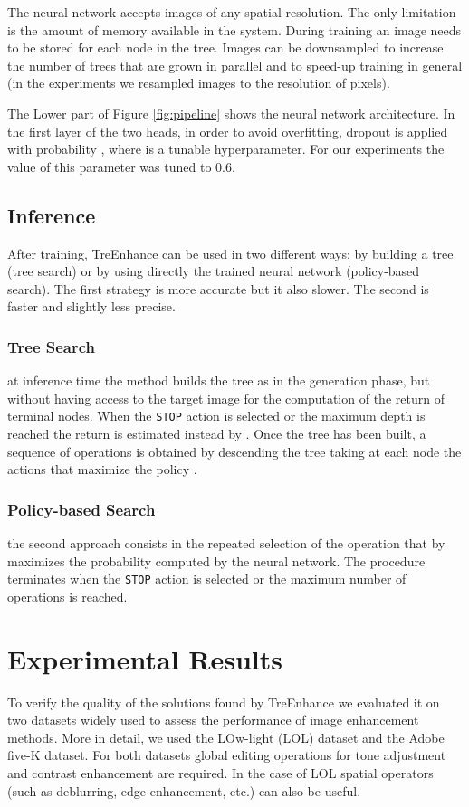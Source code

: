 \documentclass[3p,twocolumn]{elsarticle}
\newcommand{\method}[0]{TreEnhance}
\begin{document}
The neural network accepts images of any spatial resolution.  The only limitation is  the amount of memory available in the system.
During training an image needs to be stored for each node in the tree.  Images can be downsampled to increase the number of trees that are grown in parallel and to speed-up training in general (in the experiments we resampled images to the resolution of  pixels).  


The Lower part of Figure \ref{fig:pipeline} shows the neural network architecture.  In the first layer of the two heads, in order to avoid overfitting, dropout is applied with probability , where  is a tunable hyperparameter. For our experiments the value of this parameter was tuned to 0.6.




\subsection{Inference}
\label{inference}
After training, \method{} can be used in two different ways: by building a tree (tree search) or by using directly the trained neural network (policy-based search).
The first strategy is more accurate but it also slower. The second is faster and slightly less precise.

\subsubsection{Tree Search}
at inference time the method builds the tree as in the generation phase, but without having access to the target image for the computation of the return of terminal nodes.
When the \texttt{STOP} action is selected or the maximum depth is reached the return is estimated instead by .
Once the tree has been built, a sequence of operations is obtained by descending the tree taking at each node the actions that maximize the policy .

\subsubsection{Policy-based Search}
the second approach consists in the repeated selection of the operation that by maximizes the probability  computed by the neural network.  The procedure terminates when the \texttt{STOP} action is selected or the maximum number of operations is reached.


\section{Experimental Results}
\label{sec:exp_res}
To verify the quality of the solutions found by \method{} we evaluated it on two datasets widely used to assess the performance of image enhancement methods.  More in detail, we used the LOw-light (LOL) dataset and the Adobe five-K dataset.  For both datasets global editing operations for tone adjustment and contrast enhancement are required.  In the case of LOL spatial operators (such as deblurring, edge enhancement, etc.) can also be useful.
\end{document}
